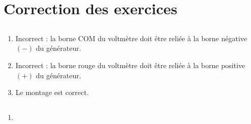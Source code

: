 \documentclass[12pt,a4paper]{article}
\begin{document}
\appendix



\newpage

\section*{Correction des exercices}

\subsection*{}


\subsection*{}


	\begin{enumerate}
		\item Incorrect : la borne COM du voltmètre doit être reliée à la borne négative $(-)$ du générateur.
		\item Incorrect : la borne rouge du voltmètre doit être reliée à la borne positive $(+)$ du générateur.
		\item Le montage est correct.
	\end{enumerate}


\subsection*{}
\begin{multicols}{2}
	\begin{enumerate}
		\item 
	\end{enumerate}
\end{multicols}

\subsection*{}
\end{document}
